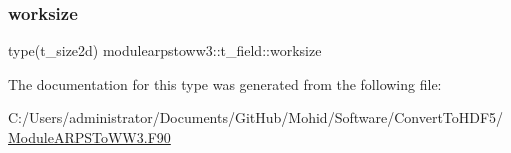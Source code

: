 \mbox{\label{structmodulearpstoww3_1_1t__field_ada6e07c18b34f7a52b243cdf7542d79d}} 
\subsubsection{\texorpdfstring{worksize}{worksize}}
{\footnotesize\ttfamily type(t\+\_\+size2d) modulearpstoww3\+::t\+\_\+field\+::worksize\hspace{0.3cm}{\ttfamily [private]}}



The documentation for this type was generated from the following file\+:\begin{DoxyCompactItemize}
\item 
C\+:/\+Users/administrator/\+Documents/\+Git\+Hub/\+Mohid/\+Software/\+Convert\+To\+H\+D\+F5/\mbox{\hyperlink{_module_a_r_p_s_to_w_w3_8_f90}{Module\+A\+R\+P\+S\+To\+W\+W3.\+F90}}\end{DoxyCompactItemize}
